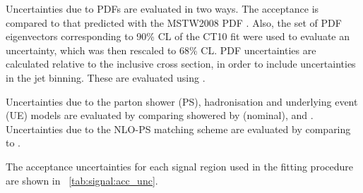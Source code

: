 Uncertainties due to PDFs are evaluated in two ways. The acceptance is compared to 
that predicted with the MSTW2008 PDF \cite{MSTW}. Also, the set of PDF eigenvectors 
corresponding to 90\% CL of the CT10 fit were used to evaluate an uncertainty, 
which was then rescaled to 68\% CL. PDF uncertainties are calculated relative to the 
inclusive cross section, in order to include uncertainties in the jet binning. These are 
evaluated using \mcatnlo.

Uncertainties due to the parton shower (PS), hadronisation and underlying event (UE) 
models are evaluated by comparing \powhegbox showered by  (nominal),  
and \fherwig. Uncertainties due to the NLO-PS matching scheme are evaluated by comparing 
\meps{\powhegbox}{\fherwig} to \meps{\mcatnlo}{\herwigpp}.

The acceptance uncertainties for each signal region used in the fitting procedure are 
shown in \Table~\ref{tab:signal:acc_unc}.

